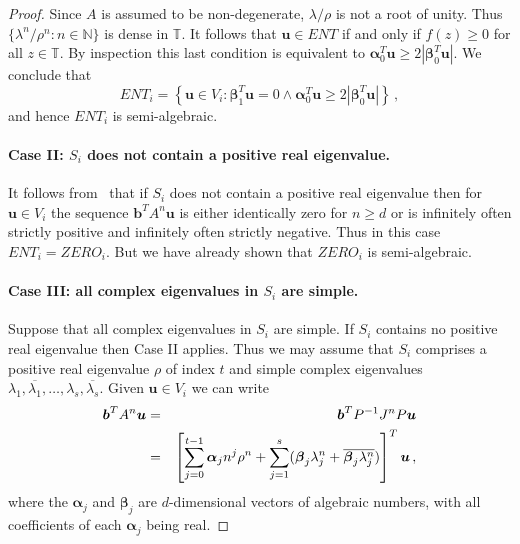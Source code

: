 \begin{proof}
Since $A$ is assumed to be non-degenerate, $\lambda/\rho$ is not a
root of unity.  Thus $\{\lambda^n/\rho^n:n\in\mathbb{N}\}$ is dense in
$\mathbb{T}$.  It follows that $\boldsymbol{u}\in\mathit{ENT}$ if and
only if $f(z)\geq 0$ for all $z\in\mathbb{T}$.  By inspection this
last condition is equivalent to $\boldsymbol{\alpha}_0^T\boldsymbol{u}
\geq 2|\boldsymbol{\beta}_0^T\boldsymbol{u}|$.
We conclude that
\[ \mathit{ENT}_i = \left\{ \boldsymbol{u}\in V_i :
\boldsymbol{\beta}_1^T\boldsymbol{u}=0 \wedge
\boldsymbol{\alpha}_0^T\boldsymbol{u} \geq 2|\boldsymbol{\beta}_0^T\boldsymbol{u}| \right\} \, ,\]
and hence $\mathit{ENT}_i$ is semi-algebraic.

\paragraph{Case II: $S_i$ does not contain a positive real eigenvalue.}
It follows from~\cite[Lemma 4]{Bra06} that if $S_i$ does not contain a
positive real eigenvalue then for $\boldsymbol{u}\in V_i$ the sequence
$\boldsymbol{b}^TA^n\boldsymbol{u}$ is either identically zero for $n\geq
d$ or is infinitely often strictly positive and infinitely often
strictly negative.  Thus in this case
$\mathit{ENT}_i=\mathit{ZERO}_i$.  But we have already shown that
$\mathit{ZERO}_i$ is semi-algebraic.


\paragraph{Case III: all complex eigenvalues in $S_i$ are simple.}
Suppose that all complex eigenvalues in $S_i$ are simple.  If $S_i$
contains no positive real eigenvalue then Case II applies.  Thus we
may assume that $S_i$ comprises a positive real eigenvalue $\rho$ of
index $t$ and simple complex eigenvalues
$\lambda_1,\overline{\lambda_1},\ldots,\lambda_s,\overline{\lambda_s}$.
Given $\boldsymbol{u}\in V_i$ we can write
\begin{eqnarray}
\boldsymbol{b}^TA^n\boldsymbol{u} &=& \boldsymbol{b}^TP^{-1}J^nP\boldsymbol{u}
\notag\\
&=& \left[\sum_{j=0}^{t-1} \boldsymbol{\alpha}_j n^j \rho^n + \sum_{j=1}^s
(\boldsymbol{\beta}_j \lambda_j^n + \overline{\boldsymbol{\beta}_j \lambda^n_j})
\right]^T\boldsymbol{u} \, ,
\label{eq:exp-poly}
\end{eqnarray}
where the $\boldsymbol{\alpha}_j$ and $\boldsymbol{\beta}_j$ are
$d$-dimensional vectors of algebraic numbers, with all coefficients of
each $\boldsymbol{\alpha}_j$ being real.


\end{proof}
